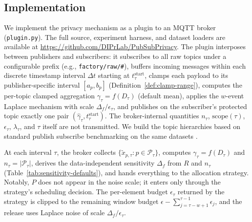 \subsection{Implementation}
\label{sec:impl}

We implement the privacy mechanism as a plugin to an MQTT broker (\texttt{plugin.py}). The full source, experiment harness, and dataset loaders are available at \url{https://github.com/DIPrLab/PubSubPrivacy}. The plugin interposes between publishers and subscribers: it subscribes to all raw topics under a configurable prefix (e.g., \texttt{factory/raw/\#}), buffers incoming messages within each discrete timestamp interval $\Delta t$ starting at $t_\tau^{\text{start}}$, clamps each payload to its publisher-specific interval $[a_p, b_p]$ (Definition~\ref{def:clamp-range}), computes the per-topic clamped aggregation $\gamma_\tau = f(D_\tau)$ (default mean), applies the $w$-event Laplace mechanism with scale $\Delta_f/\epsilon_\tau$, and publishes on the subscriber's protected topic exactly one pair $(\hat{\gamma} _\tau, t_\tau^{\text{start}})$. The broker-internal quantities $n_\tau$, $\mathrm{scope}(\tau)$, $\epsilon_\tau$, $\lambda_\tau$, and $\tau$ itself are not transmitted. We build the topic hierarchies based on standard publish subscribe benchmarking on the same datasets \cite{CHRISTIAN}.


At each interval $\tau$, the broker collects $\{\tilde{x}_{p,\tau} : p \in \mathcal{P}_\tau\}$, computes $\gamma_\tau = f(D_\tau)$ and $n_\tau = |\mathcal{P}_\tau|$, derives the data-independent sensitivity $\Delta_f$ from $R$ and $n_\tau$ (Table~\ref{tab:sensitivity-defaults}), and hands everything to the allocation strategy. Notably, $P$ does not appear in the noise scale; it enters only through the strategy's scheduling decision. The per-element budget $\epsilon_\tau$ returned by the strategy is clipped to the remaining window budget $\epsilon - \sum_{j=\tau-w+1}^{\tau-1} \epsilon_j$, and the release uses Laplace noise of scale $\Delta_f/\epsilon_\tau$.

